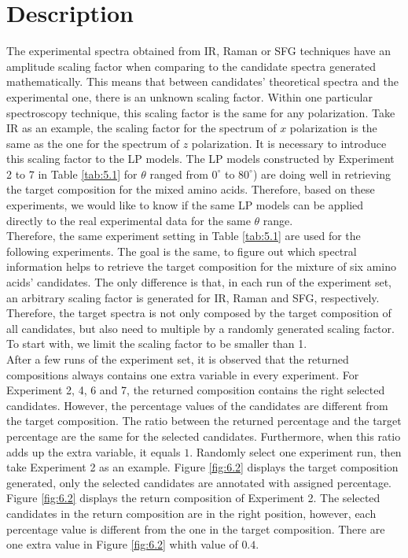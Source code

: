  \label{ch:6}
\section{Description}
The experimental spectra obtained from IR, Raman or SFG techniques have an amplitude scaling factor when comparing to the candidate spectra generated mathematically. This means that between candidates' theoretical spectra and the experimental one, there is an unknown scaling factor. Within one particular spectroscopy technique, this scaling factor is the same for any polarization. Take IR as an example, the scaling factor for the spectrum of $x$ polarization is the same as the one for the spectrum of $z$ polarization. It is necessary to introduce this scaling factor to the LP models. The LP models constructed by Experiment 2 to 7 in Table \ref{tab:5.1} for $\theta$ ranged from $0^{\circ}$ to $80^{\circ}$) are doing well in retrieving the target composition for the mixed amino acids. Therefore, based on these experiments, we would like to know if the same LP models can be applied directly to the real experimental data for the same $\theta$ range.\\

Therefore, the same experiment setting in Table \ref{tab:5.1} are used for the following experiments. The goal is the same, to figure out which spectral information helps to retrieve the target composition for the mixture of six amino acids' candidates. The only difference is that, in each run of the experiment set, an arbitrary scaling factor is generated for IR, Raman and SFG, respectively. Therefore, the target spectra is not only composed by the target composition of all candidates, but also need to multiple by a randomly generated scaling factor. \\

To start with, we limit the scaling factor to be smaller than 1. \\

After a few runs of the experiment set, it is observed that the returned compositions always contains one extra variable in every experiment. For Experiment 2, 4, 6 and 7, the returned composition contains the right selected candidates. However, the percentage values of the candidates are different from the target composition. The ratio between the returned percentage and the target percentage are the same for the selected candidates. Furthermore, when this ratio adds up the extra variable, it equals $1$. Randomly select one experiment run, then take Experiment 2 as an example. Figure \ref{fig:6.2} displays the target composition generated, only the selected candidates are annotated with assigned percentage. Figure \ref{fig:6.2} displays the return composition of Experiment 2. The selected candidates in the return composition are in the right position, however, each percentage value is different from the one in the target composition. There are one extra value in Figure \ref{fig:6.2} whith value of $0.4$. \\

